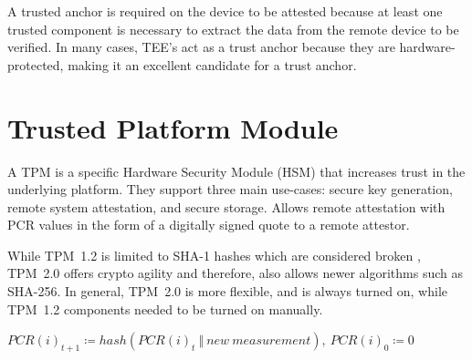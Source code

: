 A trusted anchor is required on the device to be attested because at least one trusted component is necessary to extract the data from the remote device to be verified. In many cases, TEE's act as a trust anchor because they are hardware-protected, making it an excellent candidate for a trust anchor.

\section{Trusted Platform Module}

A TPM is a specific Hardware Security Module (HSM) that increases trust in the underlying platform.
They support three main use-cases: secure key generation, remote system attestation, and secure storage. 
Allows remote attestation with PCR values in the form of a digitally signed quote to a remote attestor.



While TPM~1.2 is limited to SHA-1 hashes which are considered broken \cite{Stevens2017}, TPM~2.0 offers crypto agility and therefore, also allows newer algorithms such as SHA-256. In general, TPM~2.0 is more flexible, and is always turned on, while TPM~1.2 components needed to be turned on manually.

$PCR(i)_{t+1} \coloneqq hash(PCR(i)_t\ \Vert\ new\ measurement),\ PCR(i)_0 \coloneqq 0$

